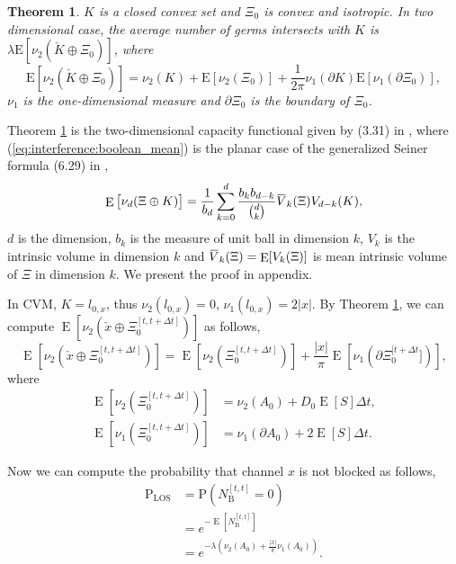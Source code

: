 \documentclass[10pt, conference, letterpaper]{IEEEtran}
\newtheorem{theorem}{Theorem}
\DeclareMathOperator*{\E}{\mathrm{E}}
\newcommand{\overbar}[1]{\mkern 1.5mu\overline{\mkern-1.5mu#1\mkern-1.5mu}\mkern 1.5mu}
\begin{document}
\begin{theorem}\label{theorem:boolean_mean}
$K$ is a closed convex set and $\Xi_0$ is convex and isotropic. In two dimensional case, the average number of germs intersects  with $K$ is $\lambda\mathrm{E}[\nu_2(\check{K}\oplus \Xi_0)]$, where 
\begin{equation}\label{eq:interference:boolean_mean}
\mathrm{E}[\nu_2(\check{K}\oplus \Xi_0)] = \nu_2(K) + \mathrm{E}[\nu_2(\Xi_0)] + \frac{1}{2\pi}\nu_1(\partial K)\mathrm{E}[\nu_1(\partial \Xi_0)],
\end{equation}
$\nu_1$ is the one-dimensional measure and $\partial \Xi_0$ is the boundary of $\Xi_0$.
\end{theorem}
Theorem \ref{theorem:boolean_mean} is the two-dimensional capacity functional given by (3.31) in \cite{stochasticapp}, where (\ref{eq:interference:boolean_mean}) is the planar case of the generalized Seiner formula (6.29) in \cite{stochasticapp},  
\begin{equation*}
\E\big[\nu_d(\Xi\oplus K)\big] = \frac{1}{b_d}\sum\limits_{k=0}^{d}\frac{b_k b_{d-k}}{{d \choose k}}\overbar{V}_k(\Xi) V_{d-k}(K),
\end{equation*}
$d$ is the dimension, $b_k$ is the measure of unit ball in dimension $k$, $V_k$ is the intrinsic volume in dimension $k$ and $\overbar{V}_k(\Xi) = \E[V_k(\Xi)]$ is mean intrinsic volume of $\Xi$ in dimension $k$. We present the proof in appendix.

In CVM, $K = l_{0,x}$, thus $\nu_2(l_{0,x}) = 0$, $\nu_1(l_{0,x}) = 2|x|$.
By Theorem \ref{theorem:boolean_mean}, we can compute $\E[\nu_2(\check{x}\oplus\Xi_0^{[t, t+\Delta t]})]$ as follows,
\begin{equation}\label{eq:boolean_mean}
\E[\nu_2(\check{x}\oplus\Xi_0^{[t, t+\Delta t]})] = \E[\nu_2(\Xi_0^{[t, t+\Delta t]})] + \frac{|x|}{\pi}\E[\nu_1(\partial \Xi_0^{[t + \Delta t}])],
\end{equation}
where
\begin{equation*}
\begin{split}
\E[\nu_2(\Xi_0^{[t, t+\Delta t]})] & = \nu_2(A_0) + D_0\E[S]\Delta t,\\
\E[\nu_1(\Xi_0^{[t, t+\Delta t]})] & = \nu_1(\partial A_0) + 2\E[S]\Delta t.
\end{split}
\end{equation*}

Now we can compute the probability that channel $x$ is not blocked as follows, 
\begin{equation}\label{eq:P_LOS}
\begin{aligned}
\mathrm{P}_{\mathrm{LOS}} & = \mathrm{P}(N_{\mathrm{B}}^{[t, t]}=0)  \\
& = e^{-\E[N_\mathrm{B}^{[t,t]}]} \\
& = e^{-\lambda(\nu_2(A_0) + \frac{|x|}{\pi}\nu_1(A_0))}. 
\end{aligned}
\end{equation}
\end{document}
